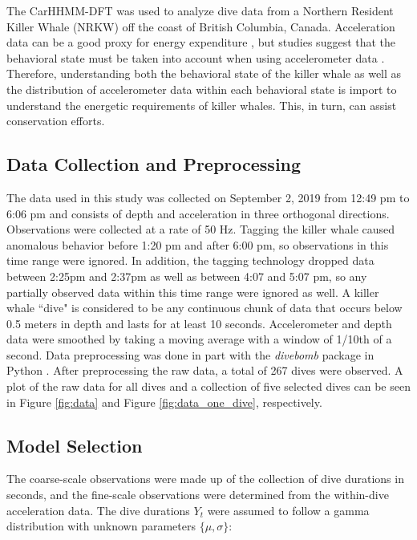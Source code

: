 

The CarHHMM-DFT was used to analyze dive data from a Northern Resident Killer Whale (NRKW) off the coast of British Columbia, Canada. Acceleration data can be a good proxy for energy expenditure \citep{Green:2009}, but studies suggest that the behavioral state must be taken into account when using accelerometer data \citep{Dot:2016}. Therefore, understanding both the behavioral state of the killer whale as well as the distribution of accelerometer data within each behavioral state is import to understand the energetic requirements of killer whales. This, in turn, can assist conservation efforts.

\subsection{Data Collection and Preprocessing}

The data used in this study was collected on September 2, 2019 from 12:49 pm to 6:06 pm and consists of depth and acceleration in three orthogonal directions. Observations were collected at a rate of 50 Hz. Tagging the killer whale caused anomalous behavior before 1:20 pm and after 6:00 pm, so observations in this time range were ignored. In addition, the tagging technology dropped data between 2:25pm and 2:37pm as well as between 4:07 and 5:07 pm, so any partially observed data within this time range were ignored as well. A killer whale ``dive" is considered to be any continuous chunk of data that occurs below 0.5 meters in depth and lasts for at least 10 seconds. Accelerometer and depth data were smoothed by taking a moving average with a window of 1/10th of a second. Data preprocessing was done in part with the \textit{divebomb} package in Python \citep{Nunes:2018}. After preprocessing the raw data, a total of 267 dives were observed. A plot of the raw data for all dives and a collection of five selected dives can be seen in Figure \ref{fig:data} and Figure \ref{fig:data_one_dive}, respectively.

\subsection{Model Selection}

The coarse-scale observations were made up of the collection of dive durations in seconds, and the fine-scale observations were determined from the within-dive acceleration data. The dive durations $Y_t$ were assumed to follow a gamma distribution with unknown parameters $\{\mu,\sigma\}$:


